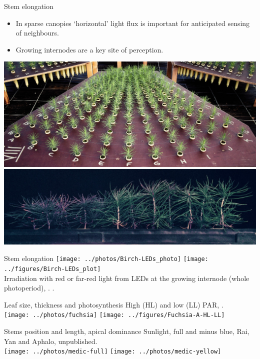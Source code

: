 \documentclass[10pt]{beamer}
\begin{document}
\begin{frame}{Stem elongation}
\footnotesize
    \begin{itemize}
        \item In sparse canopies `horizontal' light flux is important for anticipated sensing of neighbours.
        \item Growing internodes are a key site of perception.
    \end{itemize}

  \centering
  \includegraphics[width=0.8\linewidth]{photos/Pine-Nelder}\\
  \includegraphics[width=0.8\linewidth]{photos/Pine-Nelder-eos}

\end{frame}

\begin{frame}{Stem elongation}
\texttt{[image: ../photos/Birch-LEDs\_photo]}\hfil%
\texttt{[image: ../figures/Birch-LEDs\_plot]}\\
    {\small Irradiation with red or far-red light from LEDs at the growing internode (whole photoperiod),
    .}
    {\small \autocite[from][]{Aphalo2006}.}
\end{frame}

\begin{frame}{Leaf size, thickness and photosynthesis \Discussion}{}
    {\footnotesize High (HL) and low (LL) PAR,  \autocite{AphaloEtAl1991}.\\}
    \texttt{[image: ../photos/fuchsia]}%
    \texttt{[image: ../figures/Fuchsia-A-HL-LL]}
\end{frame}

\begin{frame}{Stems position and length, apical dominance}{}
    {\footnotesize Sunlight, full and minus blue,  Rai, Yan and Aphalo, unpublished.\\}
    \texttt{[image: ../photos/medic-full]}\hfil%
    \texttt{[image: ../photos/medic-yellow]}
\end{frame}
\end{document}
